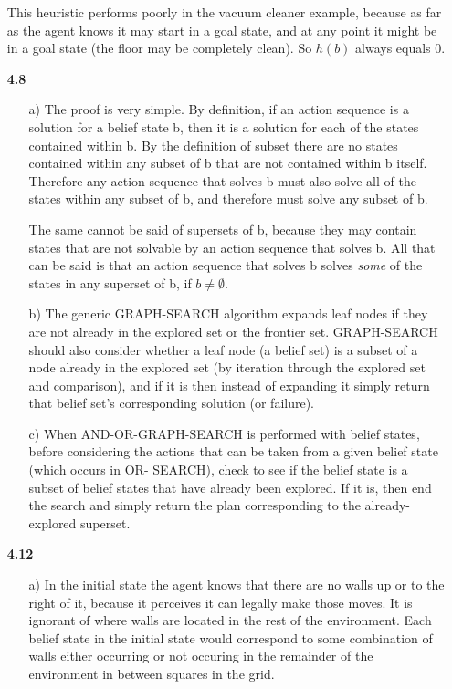 \documentclass{article}
\begin{document}
\begin{enumerate}
This heuristic performs poorly in the vacuum cleaner example, because as far
as the agent knows it may start in a goal state, and at any point it might be
in a goal state (the floor may be completely clean). So $h(b)$ always equals 0.

\item[\textbf{4.8}]
\begin{enumerate}
\item[a)]
The proof is very simple. By definition, if an action sequence is a solution
for a belief state b, then it is a solution for each of the states contained
within b. By the definition of subset there are no states contained within any
subset of b that are not contained within b itself. Therefore any action
sequence that solves b must also solve all of the states within any subset
of b, and therefore must solve any subset of b.

The same cannot be said of supersets of b, because they may contain states that
are not solvable by an action sequence that solves b. All that can be said is
that an action sequence that solves b solves \emph{some} of the states in any
superset of b, if $b \ne \emptyset$.
\item[b)]
The generic GRAPH-SEARCH algorithm expands leaf nodes if they are not already
in the explored set or the frontier set. GRAPH-SEARCH should also consider
whether a leaf node (a belief set) is a subset of a node already in the
explored set (by iteration through the explored set and comparison), and if it
is then instead of expanding it simply return that belief set's corresponding
solution (or failure).
\item[c)]
When AND-OR-GRAPH-SEARCH is performed with belief states, before considering
the actions that can be taken from a given belief state (which occurs in OR-
SEARCH), check to see if the belief state is a subset of belief states that
have already been explored. If it is, then end the search and simply return
the plan corresponding to the already-explored superset.
\end{enumerate}

\item[\textbf{4.12}]
\begin{enumerate}
\item[a)]
In the initial state the agent knows that there are no walls up or to the
right of it, because it perceives it can legally make those moves. It is
ignorant of where walls are located in the rest of the environment. Each
belief state in the initial state would correspond to some combination of
walls either occurring or not occuring in the remainder of the environment
in between squares in the grid.


\end{enumerate}
\end{enumerate}
\end{document}
